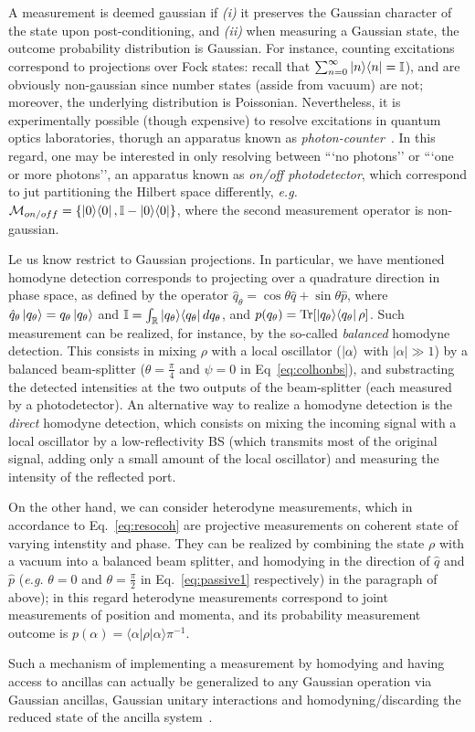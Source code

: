 A measurement is deemed gaussian if \textit{(i)} it preserves the Gaussian character of the state upon post-conditioning, and \textit{(ii)} when measuring a Gaussian state, the outcome probability distribution is Gaussian.
For instance, counting excitations correspond to projections over Fock states: recall that $\sum_{n=0}^\infty \proj{n} = \mathbb{I}$), and are obviously non-gaussian since number states (asside from vacuum) are not; moreover, the underlying distribution is Poissonian. Nevertheless, it is experimentally possible (though expensive) to resolve excitations in quantum optics laboratories, thorugh an apparatus known as \textit{photon-counter}~\cite{Photoncounter}. In this regard, one may be interested in only resolving between ```no photons'' or ```one or more photons'', an apparatus known as \textit{on/off photodetector}, which correspond to jut partitioning the Hilbert space differently, \textit{e.g.} $\mathcal{M}_{on/off} = \llaves{\proj{0}, \mathbb{I}-\proj{0}}$, where the second measurement operator is non-gaussian.

Le us know restrict to Gaussian projections. In particular, we have mentioned homodyne detection corresponds to projecting over a quadrature direction in phase space, as defined by the operator $\hat{q}_\theta = \cos\theta \hat{q}+ \sin \theta \hat{p}$, where $\hat{q}_\theta \ket{q_\theta} = q_\theta \ket{q_\theta}$ and $\mathbb{I} = \int_\mathbb{R} \proj{q_\theta} dq_\theta$, and $p(q_\theta) = \tr{\proj{q_\theta} \rho}$.
Such measurement can be realized, for instance, by the so-called \textit{balanced} homodyne detection. This consists in mixing $\rho$ with a local oscillator ($\ket{\alpha}$ with $|\alpha|\gg1$) by a balanced beam-splitter ($\theta = \frac{\pi}{4}$ and $\psi=0$ in Eq~\ref{eq:colhonbs}), and substracting the detected intensities at the two outputs of the beam-splitter (each measured by a photodetector). An alternative way to realize a homodyne detection is the \textit{direct} homodyne detection, which consists on mixing the incoming signal with a local oscillator by a low-reflectivity BS (which transmits most of the original signal, adding only a small amount of the local oscillator) and measuring the intensity of the reflected port.

On the other hand, we can consider heterodyne measurements, which in accordance to Eq.~\eqref{eq:resocoh} are projective measurements on coherent state of varying intenstity and phase. They can be realized by combining the state $\rho$ with a vacuum into a balanced beam splitter, and homodying in the direction of $\hat{q}$ and $\hat{p}$ (\textit{e.g.} $\theta = 0 $ and $\theta = \frac{\pi}{2}$ in Eq.~\ref{eq:passive1} respectively) in the paragraph of above); in this regard heterodyne measurements correspond to joint measurements of position and momenta, and its probability measurement outcome is $p(\alpha) = \langle\alpha|\rho|\alpha\rangle\pi^{-1}$.

Such a mechanism of implementing a measurement by homodying and having access to ancillas can actually be generalized to any Gaussian operation via Gaussian ancillas, Gaussian unitary interactions and homodyning/discarding the reduced state of the ancilla system~\cite{Cirac2002Characterization}.

